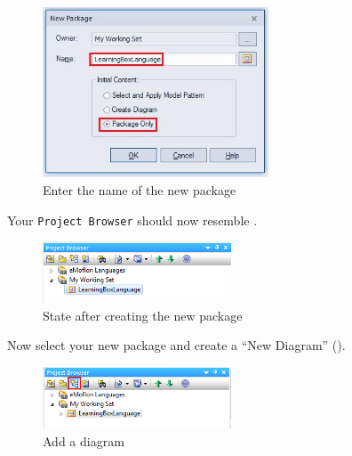 \begin{stepbystep}
\begin{figure}[htbp]
	\centering
    \includegraphics[width=0.6\textwidth]{../../org.moflon.doc.handbook.02_leitnersLearningBox/2_staticSemantics/1_newStart/nsVisImages/ea_nameEPackage}
	\caption{Enter the name of the new package}
	\label{ea:newPackageName}
\end{figure}
\FloatBarrier

\vspace{0.5cm}

\item Your \texttt{Project Browser} should now resemble .

\vspace{0.5cm}

\begin{figure}[htbp]
	\centering
  \includegraphics[width=0.5\textwidth]{../../org.moflon.doc.handbook.02_leitnersLearningBox/2_staticSemantics/1_newStart/nsVisImages/ea_newPackage}
	\caption{State after creating the new package}
	\label{ea:newPackageComplete}
\end{figure}
\FloatBarrier

\vspace{0.5cm}

\item Now select your new package and create a ``New Diagram'' ().

\vspace{0.5cm}

\begin{figure}[htbp]
	\centering
  \includegraphics[width=0.5\textwidth]{../../org.moflon.doc.handbook.02_leitnersLearningBox/2_staticSemantics/1_newStart/nsVisImages/ea_addDiagram}
	\caption{Add a diagram}
	\label{ea:newDiagram}
\end{figure}
\FloatBarrier


\end{stepbystep}
